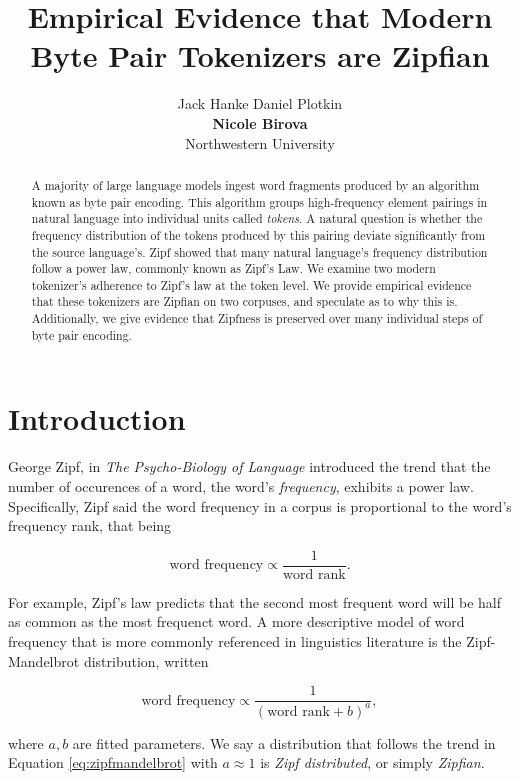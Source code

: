 \documentclass[11pt]{article}
\title{Empirical Evidence that Modern Byte Pair Tokenizers are Zipfian}
\author{Jack Hanke \qquad Daniel Plotkin \\ 
        {\bf Nicole Birova} \qquad {\bf David Demeter} \\
        Northwestern University }
\begin{document}
\maketitle
\begin{abstract}
A majority of large language models ingest word fragments produced by an algorithm known as byte pair encoding. This algorithm groups high-frequency element pairings in natural language into individual units called \textit{tokens}. A natural question is whether the frequency distribution of the tokens produced by this pairing deviate significantly from the source language's. Zipf showed that many natural language's frequency distribution follow a power law, commonly known as Zipf's Law. We examine two modern tokenizer's adherence to Zipf's law at the token level. We provide empirical evidence that these tokenizers are Zipfian on two corpuses, and speculate as to why this is. Additionally, we give evidence that Zipfness is preserved over many individual steps of byte pair encoding.
\end{abstract}

\section{Introduction}
\label{section:intro}

George Zipf, in \textit{The Psycho-Biology of Language} \cite{Zip35} introduced the trend that the number of occurences of a word, the word's \textit{frequency}, exhibits a power law. Specifically, Zipf said the word frequency in a corpus is proportional to the word's frequency rank, that being

\begin{equation}
    \mbox{word frequency} \propto \frac{1}{\mbox{word rank}}.
\end{equation}

For example, Zipf's law predicts that the second most frequent word will be half as common as the most frequenct word. A more descriptive model of word frequency that is more commonly referenced in linguistics literature is the Zipf-Mandelbrot distribution, written

\begin{equation}
    \mbox{word frequency} \propto \frac{1}{(\mbox{word rank} + b)^a}, 
    \label{eq:zipfmandelbrot}
\end{equation}

where $a,b$ are fitted parameters. We say a distribution that follows the trend in Equation \ref{eq:zipfmandelbrot} with $a \approx 1$ is \textit{Zipf distributed}, or simply \textit{Zipfian}.
\end{document}
